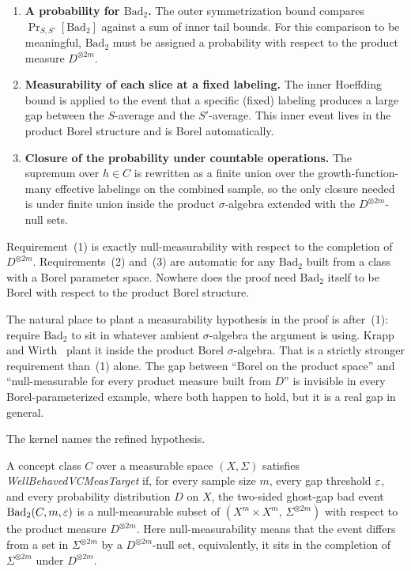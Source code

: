 \begin{enumerate}[leftmargin=*,itemsep=3pt]
  \item \textbf{A probability for $\mathrm{Bad}_2$.} The outer
    symmetrization bound compares
    $\Pr_{S,S'}[\mathrm{Bad}_2]$ against a sum of inner tail bounds.
    For this comparison to be meaningful, $\mathrm{Bad}_2$ must be
    assigned a probability with respect to the product measure
    $D^{\otimes 2m}$.
  \item \textbf{Measurability of each slice at a fixed labeling.}
    The inner Hoeffding bound is applied to the event that a specific
    (fixed) labeling produces a large gap between the $S$-average and
    the $S'$-average. This inner event lives in the product Borel
    structure and is Borel automatically.
  \item \textbf{Closure of the probability under countable
    operations.} The supremum over $h \in C$ is rewritten as a
    finite union over the growth-function-many effective labelings on
    the combined sample, so the only closure needed is under finite
    union inside the product $\sigma$-algebra extended with the
    $D^{\otimes 2m}$-null sets.
\end{enumerate}

Requirement~(1) is exactly null-measurability with respect to the
completion of $D^{\otimes 2m}$. Requirements~(2) and~(3) are
automatic for any $\mathrm{Bad}_2$ built from a class with a Borel
parameter space. Nowhere does the proof need $\mathrm{Bad}_2$ itself
to be Borel with respect to the product Borel structure.

\begin{remark}
\label{rmk:kw-diagnosis}
The natural place to plant a measurability hypothesis in the proof is
after~(1): require $\mathrm{Bad}_2$ to sit in whatever ambient
$\sigma$-algebra the argument is using. Krapp and
Wirth~\cite{KrappWirth2024} plant it inside the product Borel
$\sigma$-algebra. That is a strictly stronger requirement than~(1)
alone. The gap between ``Borel on the product space'' and
``null-measurable for every product measure built from $D$'' is
invisible in every Borel-parameterized example, where both happen to
hold, but it is a real gap in general.
\end{remark}

The kernel names the refined hypothesis.

\begin{defn}[WellBehavedVCMeasTarget]
\label{def:wbvc-meas-target}
  \leanok
A concept class $C$ over a measurable space $(X, \Sigma)$ satisfies
\emph{WellBehavedVCMeasTarget} if, for every sample size $m$, every
gap threshold $\varepsilon$, and every probability distribution $D$ on $X$,
the two-sided ghost-gap bad event $\mathrm{Bad}_2(C, m, \varepsilon)$ is a
null-measurable subset of
$(X^m \times X^m,\, \Sigma^{\otimes 2m})$ with respect to the product
measure $D^{\otimes 2m}$. Here null-measurability means that the
event differs from a set in $\Sigma^{\otimes 2m}$ by a
$D^{\otimes 2m}$-null set, equivalently, it sits in the completion of
$\Sigma^{\otimes 2m}$ under $D^{\otimes 2m}$.
\end{defn}


